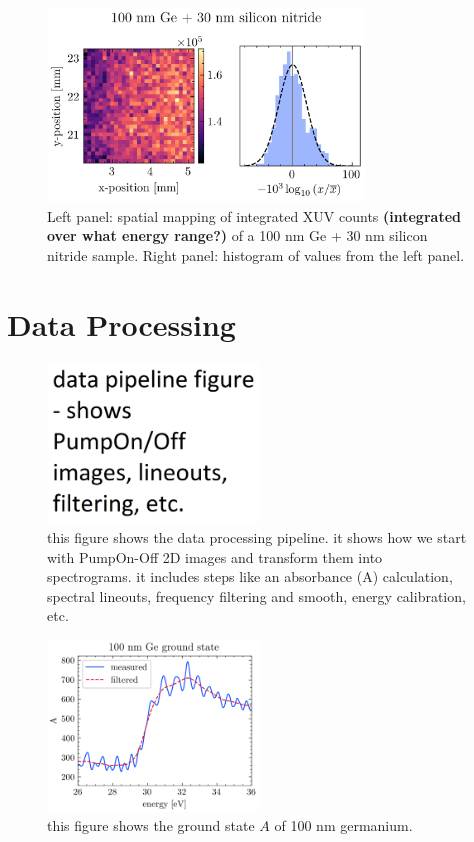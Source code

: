 \begin{figure}
	\centering
	\includegraphics[width=0.75\textwidth]{figures/chap3/Ge_map.png}
	\caption{Left panel: spatial mapping of integrated XUV counts \textbf{(integrated over what energy range?)} of a 100 nm Ge + 30 nm silicon nitride sample. Right panel: histogram of values from the left panel.}
	\label{fig:Ge_map}
\end{figure}

\section{Data Processing}

\begin{figure}
	\centering
	\includegraphics[width=0.5\textwidth]{figures/chap3/Data_Pipeline.png}
	\caption{this figure shows the data processing pipeline. it shows how we start with PumpOn-Off 2D images and transform them into spectrograms. it includes steps like an absorbance (A) calculation, spectral lineouts, frequency filtering and smooth, energy calibration, etc.}
	\label{fig:Data_Pipeline}
\end{figure}

\begin{figure}
	\centering
	\includegraphics[width=0.5\textwidth]{figures/chap3/Ge_100nm_ground_state.png}
	\caption{this figure shows the ground state $A$ of 100 nm germanium.}
	\label{fig:Ge_100nm_ground_state}
\end{figure}

